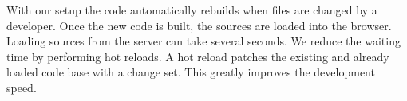 \documentclass[../ClassicThesis.tex]{subfiles}
\begin{document}
With our setup the code automatically rebuilds when files
are changed by a developer. Once the new code is built, the
sources are loaded into the browser. Loading sources from
the server can take several seconds. We reduce the waiting
time by performing hot reloads. A hot reload patches the
existing and already loaded code base with a change set.
This greatly improves the development speed.









\end{document}
